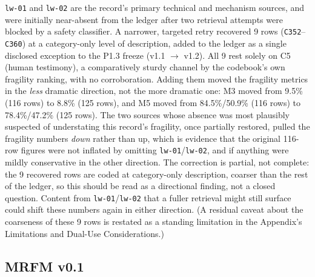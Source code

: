 \documentclass[10pt]{article}
\begin{document}
\texttt{lw-01} and \texttt{lw-02} are the record's primary technical and
mechanism sources, and were initially near-absent from the ledger after two
retrieval attempts were blocked by a safety classifier. A narrower, targeted
retry recovered 9 rows (\texttt{C352}--\texttt{C360}) at a category-only
level of description, added to the ledger as a single disclosed exception to
the P1.3 freeze (v1.1 $\rightarrow$ v1.2). All 9 rest solely on C5 (human
testimony), a comparatively sturdy channel by the codebook's own fragility
ranking, with no corroboration. Adding them moved the fragility metrics in
the \emph{less} dramatic direction, not the more dramatic one: M3 moved
from 9.5\% (116 rows) to 8.8\% (125 rows), and M5 moved from 84.5\%/50.9\%
(116 rows) to 78.4\%/47.2\% (125 rows). The two sources whose absence was
most plausibly suspected of understating this record's fragility, once
partially restored, pulled the fragility numbers \emph{down} rather than
up, which is evidence that the original 116-row figures were not inflated
by omitting \texttt{lw-01}/\texttt{lw-02}, and if anything were mildly
conservative in the other direction. The correction is partial, not
complete: the 9 recovered rows are coded at category-only description,
coarser than the rest of the ledger, so this should be read as a
directional finding, not a closed question. Content from
\texttt{lw-01}/\texttt{lw-02} that a fuller retrieval might still surface
could shift these numbers again in either direction. (A residual caveat
about the coarseness of these 9 rows is restated as a standing limitation in
the Appendix's Limitations and Dual-Use Considerations.)

\subsection{MRFM v0.1}
\label{sec:mrfm}
\end{document}
